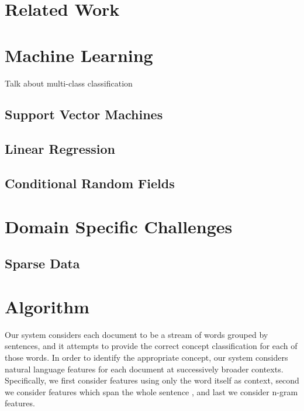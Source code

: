 \documentclass[preprint]{style}
\begin{document}
\section{Related Work}

\vspace{1in}



\section{Machine Learning}

Talk about multi-class classification

\subsection{Support Vector Machines}

\subsection{Linear Regression}

\subsection{Conditional Random Fields}

\vspace{1in}



\section{Domain Specific Challenges}

\subsection{Sparse Data}

\vspace{1in}



\section{Algorithm}
Our system considers each document to be a stream of words grouped by sentences, and it attempts to provide the correct concept classification for each of those words. In order to identify the appropriate concept, our system considers natural language features for each document at successively broader contexts. Specifically, we first consider features using only the word itself as context, second we consider features which span the whole sentence , and last we consider n-gram features.
\end{document}
